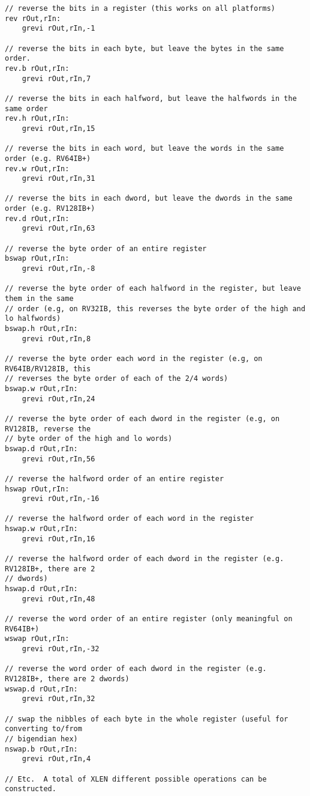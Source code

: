 \begin{verbatim}
// reverse the bits in a register (this works on all platforms)
rev rOut,rIn:
    grevi rOut,rIn,-1

// reverse the bits in each byte, but leave the bytes in the same order.
rev.b rOut,rIn:
    grevi rOut,rIn,7

// reverse the bits in each halfword, but leave the halfwords in the same order
rev.h rOut,rIn:
    grevi rOut,rIn,15

// reverse the bits in each word, but leave the words in the same order (e.g. RV64IB+)
rev.w rOut,rIn:
    grevi rOut,rIn,31

// reverse the bits in each dword, but leave the dwords in the same order (e.g. RV128IB+)
rev.d rOut,rIn:
    grevi rOut,rIn,63

// reverse the byte order of an entire register
bswap rOut,rIn:
    grevi rOut,rIn,-8

// reverse the byte order of each halfword in the register, but leave them in the same
// order (e.g, on RV32IB, this reverses the byte order of the high and lo halfwords)
bswap.h rOut,rIn:
    grevi rOut,rIn,8

// reverse the byte order each word in the register (e.g, on RV64IB/RV128IB, this
// reverses the byte order of each of the 2/4 words)
bswap.w rOut,rIn:
    grevi rOut,rIn,24

// reverse the byte order of each dword in the register (e.g, on RV128IB, reverse the
// byte order of the high and lo words)
bswap.d rOut,rIn:
    grevi rOut,rIn,56

// reverse the halfword order of an entire register
hswap rOut,rIn:
    grevi rOut,rIn,-16

// reverse the halfword order of each word in the register
hswap.w rOut,rIn:
    grevi rOut,rIn,16

// reverse the halfword order of each dword in the register (e.g. RV128IB+, there are 2
// dwords)
hswap.d rOut,rIn:
    grevi rOut,rIn,48

// reverse the word order of an entire register (only meaningful on RV64IB+)
wswap rOut,rIn:
    grevi rOut,rIn,-32

// reverse the word order of each dword in the register (e.g. RV128IB+, there are 2 dwords)
wswap.d rOut,rIn:
    grevi rOut,rIn,32

// swap the nibbles of each byte in the whole register (useful for converting to/from
// bigendian hex)
nswap.b rOut,rIn:
    grevi rOut,rIn,4

// Etc.  A total of XLEN different possible operations can be constructed.
\end{verbatim}

